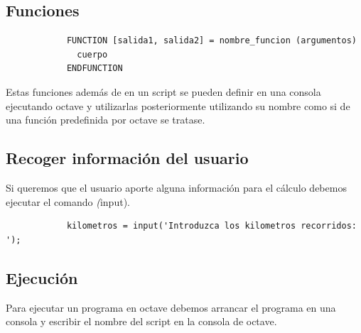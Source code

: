 \documentclass[a4,12pt,graphicx,caption,rotating]{article}
\begin{document}
\subsection{Funciones}
\begin{verbatim}
            FUNCTION [salida1, salida2] = nombre_funcion (argumentos)
              cuerpo
            ENDFUNCTION
\end{verbatim}

Estas funciones además de en un script se pueden definir en una consola ejecutando octave y utilizarlas posteriormente utilizando su nombre como si de una función predefinida por octave se tratase.
\subsection{Recoger información del usuario}
Si queremos que el usuario aporte alguna información para el cálculo debemos ejecutar el comando \emph(input).
\begin{verbatim}
            kilometros = input('Introduzca los kilometros recorridos: ');
\end{verbatim}
\subsection{Ejecución}
Para ejecutar un programa en octave debemos arrancar el programa en una consola y escribir el nombre del script en la consola de octave.
\end{document}
